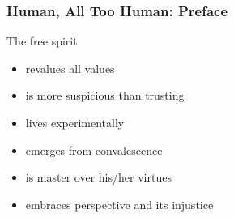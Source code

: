 \documentclass[xcolor=dvipsnames]{beamer}
\begin{document}


\begin{frame}
  \frametitle{Human, All Too Human: Preface}
  The free spirit
  \begin{itemize}
  \item revalues all values
  \item is more suspicious than trusting
  \item lives experimentally
  \item emerges from convalescence
  \item is master over his/her virtues
  \item embraces perspective and its injustice
  \end{itemize}
\end{frame}
\end{document}
